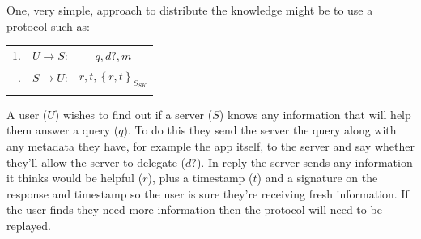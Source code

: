 \documentclass[a4paper]{scrartcl}
\begin{document}
One, very simple, approach to distribute the knowledge might be to use a protocol such as:
\begin{center}
  \begin{tabular}{rrc}
    \toprule
    1. & $U \longrightarrow S$:        & $q, d?, m$ \\ \addlinespace
    2. & $S \longrightarrow U$:        & $r, t,  \left\{ r, t \right\}_{S_{SK}}$  \\ \addlinespace
    \bottomrule
  \end{tabular}
\end{center}
A user ($U$) wishes to find out if a server ($S$) knows any information that will help them answer a query ($q$).
To do this they send the server the query along with any metadata they have, for example the app itself, to the server and say whether they'll allow the server to delegate ($d?$).
In reply the server sends any information it thinks would be helpful ($r$), plus a timestamp ($t$) and a signature on the response and timestamp so the user is sure they're receiving fresh information.
If the user finds they need more information then the protocol will need to be replayed.
\end{document}
